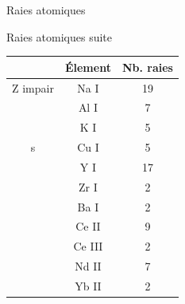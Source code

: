 \documentclass[10pt]{beamer}
\begin{document}
\begin{frame}[fragile]{Raies atomiques}
\end{frame}
\begin{frame}[fragile]{Raies atomiques suite}
            \begin{table}[h!]
            \begin{center}
                \begin{tabular}{c|c|c}
                     & Élement & Nb. raies\\
                    \hline
                    Z impair & Na I &19\\
                     & Al I &7\\
                     & K I &5 \\
                    s & Cu I & 5\\
                     & Y I & 17\\
                     & Zr I & 2\\
                     & Ba I & 2\\
                     & Ce II & 9\\
                     & Ce III & 2\\
                     & Nd II & 7\\
                     & Yb II & 2\\
                \end{tabular}
            \end{center}
        \end{table}
\end{frame}
\end{document}
